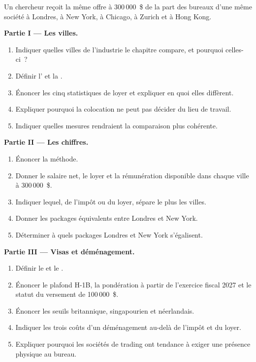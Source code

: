 \begin{problem}\label{pb:in:locations:1}
Un chercheur reçoit la même offre à 300\,000~\$ de la part des bureaux d'une même société à Londres, à New York, à Chicago, à Zurich et à Hong Kong.

\medskip\noindent\textbf{Partie I --- Les villes.}
\begin{enumerate}
\item Indiquer quelles villes de l'industrie le chapitre compare, et pourquoi celles-ci~?
\item Définir l' et la .
\item Énoncer les cinq statistiques de loyer et expliquer en quoi elles diffèrent.
\item Expliquer pourquoi la colocation ne peut pas décider du lieu de travail.
\item Indiquer quelles mesures rendraient la comparaison plus cohérente.
\end{enumerate}

\medskip\noindent\textbf{Partie II --- Les chiffres.}
\begin{enumerate}[resume]
\item Énoncer la méthode.
\item Donner le salaire net, le loyer et la rémunération disponible dans chaque ville à 300\,000~\$.
\item Indiquer lequel, de l'impôt ou du loyer, sépare le plus les villes.
\item Donner les packages équivalents entre Londres et New York.
\item Déterminer à quels packages Londres et New York s'égalisent.
\end{enumerate}

\medskip\noindent\textbf{Partie III --- Visas et déménagement.}
\begin{enumerate}[resume]
\item Définir le  et le .
\item Énoncer le plafond H-1B, la pondération à partir de l'exercice fiscal 2027 et le statut du versement de 100\,000~\$.
\item Énoncer les seuils britannique, singapourien et néerlandais.
\item Indiquer les trois coûts d'un déménagement au-delà de l'impôt et du loyer.
\item Expliquer pourquoi les sociétés de trading ont tendance à exiger une présence physique au bureau.
\end{enumerate}


\end{problem}
